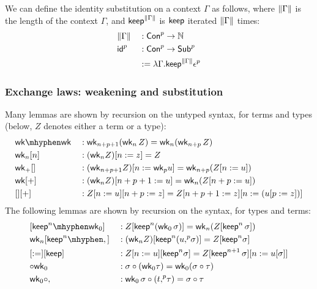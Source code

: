  We can define the identity substitution on a context $\Gamma$ as follows,
  where $\| \Gamma \|$ is the length of the context $\Gamma$, and
  $\mathsf{keep}^{\| \Gamma \|}$ is $\mathsf{keep}$ iterated $\| \Gamma \|$ times:
\begin{alignat*}{5}
  & \| \Gamma \| && : {\mathsf{Con}}^p\rightarrow\mathbb{N}
  \\
  & {\mathsf{id}}^p && : {\mathsf{Con}}^p \rightarrow {\mathsf{Sub}}^p \\
  & && := \lambda \Gamma.\mathsf{keep}^{\| \Gamma \|} {\epsilon}^p
  \end{alignat*}


  \subsubsection{Exchange laws: weakening and substitution}
  Many lemmas are shown by recursion on the untyped syntax, for terms and types
  (below, $Z$ denotes either a term or a type):
\begin{alignat*}{5}
  & \wk\mhyphen\wk && : \wk_{n+p+1} (\wk_n\,Z) = \wk_n(\wk_{n+p}\,Z)\\
  & \wk_n[n] && : (\wk_{n} Z)[ n := z] = Z \\
  & \wk_+[] && : (\wk_{n+p+1} Z)[ n := \wk_p u] = \wk_{n+p}(Z[n := u]) \\
  & \wk[+] && : (\wk_{n} Z)[ n+p+1 :=  u] = \wk_{n}(Z[n+p := u]) \\
  & [][+] && : Z[n :=u][n+p:=z] = Z[n+p+1:=z][n:= (u[p:=z])]
  \end{alignat*}
  The following lemmas are shown by recursion on the syntax, for types and terms:
\begin{alignat*}{5}
  & [\keep^n\mhyphen \wkO] && : Z[\keep^n (\wkO\,\sigma)] = \wk_n (Z[\keep^n\,\sigma])
  \\
  & \wk_n[\keep^n\mhyphen\cons]  & &
  :
  (\wk_n Z) [\keep^n (u \consu \sigma)] = Z [ \keep^n \sigma]
  \\
   & [:=][\keep] && : Z [ n:= u][\keep^n \sigma] =  Z[\keep^{n+1}\,\sigma][n := u[\sigma]]
   \\
   & {}{\circ}{}\wkO & & : \sigma \circ (\wkO \tau) = \wkO (\sigma \circ \tau)
   \\
  & \wkO{}{\circ}{}, && : \wkO\,\sigma \circ (t \consu \tau ) = \sigma \circ \tau
  \end{alignat*}
